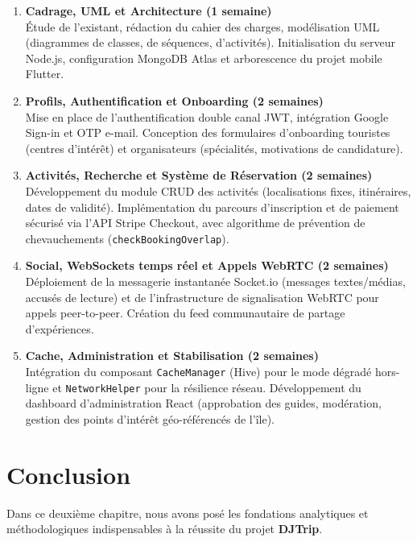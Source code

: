 \documentclass[12pt,a4paper]{report}
\begin{document}
\begin{enumerate}[label=\textbf{Sprint \arabic* :}]
    \setcounter{enumitem}{ -1}
    \item \textbf{Cadrage, UML et Architecture (1 semaine)} \\
    Étude de l'existant, rédaction du cahier des charges, modélisation UML (diagrammes de classes, de séquences, d'activités). Initialisation du serveur Node.js, configuration MongoDB Atlas et arborescence du projet mobile Flutter.
    
    \item \textbf{Profils, Authentification et Onboarding (2 semaines)} \\
    Mise en place de l'authentification double canal JWT, intégration Google Sign-in et OTP e-mail. Conception des formulaires d'onboarding touristes (centres d'intérêt) et organisateurs (spécialités, motivations de candidature).
    
    \item \textbf{Activités, Recherche et Système de Réservation (2 semaines)} \\
    Développement du module CRUD des activités (localisations fixes, itinéraires, dates de validité). Implémentation du parcours d'inscription et de paiement sécurisé via l'API Stripe Checkout, avec algorithme de prévention de chevauchements (\texttt{checkBookingOverlap}).
    
    \item \textbf{Social, WebSockets temps réel et Appels WebRTC (2 semaines)} \\
    Déploiement de la messagerie instantanée Socket.io (messages textes/médias, accusés de lecture) et de l'infrastructure de signalisation WebRTC pour appels peer-to-peer. Création du feed communautaire de partage d'expériences.
    
    \item \textbf{Cache, Administration et Stabilisation (2 semaines)} \\
    Intégration du composant \texttt{CacheManager} (Hive) pour le mode dégradé hors-ligne et \texttt{NetworkHelper} pour la résilience réseau. Développement du dashboard d'administration React (approbation des guides, modération, gestion des points d'intérêt géo-référencés de l'île).
\end{enumerate}

\section{Conclusion}
Dans ce deuxième chapitre, nous avons posé les fondations analytiques et méthodologiques indispensables à la réussite du projet \textbf{DJTrip}.
\end{document}
